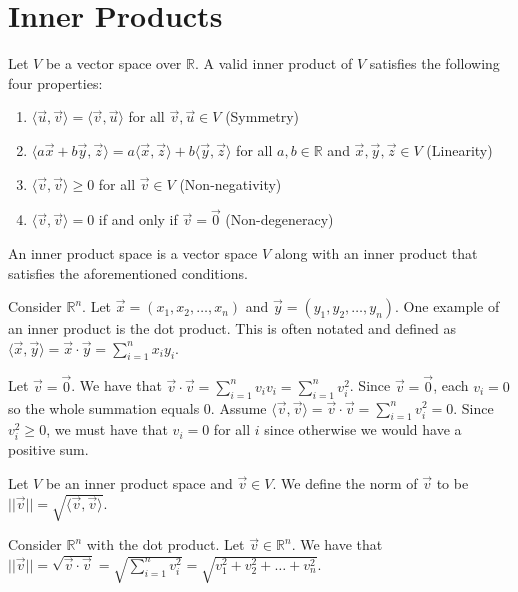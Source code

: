 \chapter{Inner Products}

Let $V$ be a vector space over $\mathbb{R}$. A valid inner product of $V$ satisfies the following four properties:
\begin{enumerate}
    \item $\langle\vec{u},\vec{v}\rangle=\langle\vec{v},\vec{u}\rangle$ for all $\vec{v},\vec{u}\in V$ (Symmetry)
    \item $\langle a\vec{x}+b\vec{y},\vec{z}\rangle=a\langle\vec{x},\vec{z}\rangle+b\langle\vec{y},\vec{z}\rangle$ for all $a,b\in\mathbb{R}$ and $\vec{x},\vec{y},\vec{z}\in V$ (Linearity)
    \item $\langle\vec{v},\vec{v}\rangle\geq 0$ for all $\vec{v}\in V$ (Non-negativity)
    \item $\langle\vec{v},\vec{v}\rangle=0$ if and only if $\vec{v}=\vec{0}$ (Non-degeneracy)
\end{enumerate}
\begin{definition}
    An inner product space is a vector space $V$ along with an inner product that satisfies the aforementioned conditions.
\end{definition}
\begin{example}
    Consider $\mathbb{R}^n$. Let $\vec{x}=(x_1, x_2,\ldots, x_n)$ and $\vec{y}=(y_1,y_2,\ldots,y_n)$. One example of an inner product is the dot product. This is often notated and defined as $\langle\vec{x},\vec{y}\rangle=\vec{x}\cdot\vec{y}=\sum_{i=1}^n x_iy_i$.

    Let $\vec{v}=\vec{0}$. We have that $\vec{v}\cdot\vec{v}=\sum_{i=1}^n v_iv_i=\sum_{i=1}^n v_i^2$. Since $\vec{v}=\vec{0}$, each $v_i=0$ so the whole summation equals $0$. Assume $\langle\vec{v},\vec{v}\rangle=\vec{v}\cdot\vec{v}=\sum_{i=1}^n v_i^2=0$. Since $v_i^2\geq 0$, we must have that $v_i=0$ for all $i$ since otherwise we would have a positive sum.
\end{example}
\begin{definition}
    Let $V$ be an inner product space and $\vec{v}\in V$. We define the norm of $\vec{v}$ to be $||\vec{v}||=\sqrt{\langle\vec{v},\vec{v}\rangle}$.
\end{definition}
\begin{example}
    Consider $\mathbb{R}^n$ with the dot product. Let $\vec{v}\in\mathbb{R}^n$. We have that $||\vec{v}||=\sqrt{\vec{v}\cdot\vec{v}}=\sqrt{\sum_{i=1}^n v_i^2}=\sqrt{v_1^2+v_2^2+\ldots+v_n^2}$.
\end{example}
